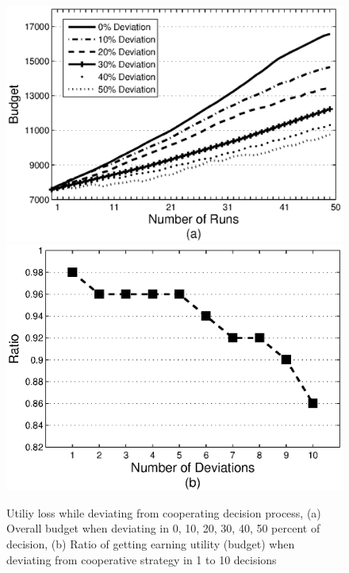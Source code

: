 \documentclass[fleqn]{singlecol-new}
\begin{document}
\begin{figure}%
\centering
\includegraphics[scale=0.4]{graphdev.eps}
\includegraphics[scale=0.4]{graphdev2.eps}
\caption{Utiliy loss while deviating from cooperating decision process, (a) Overall budget when deviating in 0, 10, 20, 30, 40, 50 percent of decision, (b) Ratio of getting earning utility (budget) when deviating from cooperative strategy in 1 to 10 decisions} \label{graph_dev}
\end{figure}

\end{document}
